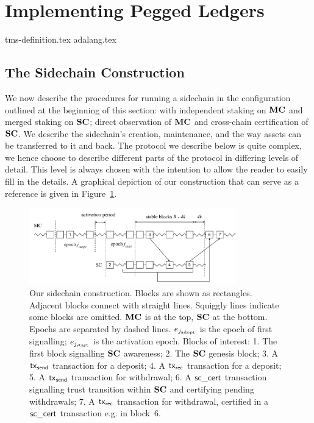 \section{Implementing Pegged Ledgers}
\label{sec:construction}




{tms-definition.tex}
{adalang.tex}

\subsection{The Sidechain Construction}
\label{sec:const}

We now describe the procedures for running a sidechain in the configuration
outlined at the beginning of this section: with independent staking on $\mathbf{MC}$ and
merged staking on $\mathbf{SC}$; direct observation of $\mathbf{MC}$ and
cross-chain certification of $\mathbf{SC}$.
We describe the sidechain's creation,
maintenance, and the way assets can be  transferred to it and back.  The
protocol we describe below is quite complex,
we hence choose to describe different parts of the protocol in
differing levels of detail. This level is always chosen with the intention to allow the
reader to easily fill in the details.
A graphical depiction of our construction that can serve as a reference
is given in Figure~\ref{fig:sidechain}.
\begin{figure}[tb]%
  \centering
  \includegraphics[width=0.8\textwidth]{chapters/sidechains/figures/sidechains-overview.pdf}
  \caption{
  Our sidechain construction. Blocks are shown as rectangles. Adjacent blocks
  connect with straight lines. Squiggly lines indicate some blocks are omitted.
  $\mathbf{MC}$ is at the top, $\mathbf{SC}$ at the bottom. Epochs are separated by dashed
  lines. $e_{j_\text{adopt}}$ is the epoch of first signalling;
  $e_{j_\text{start}}$ is the activation epoch. Blocks of interest: 1. The
  first block signalling $\mathbf{SC}$ awareness;
  2. The $\mathbf{SC}$ genesis block; 3. A $\mathsf{tx}_{\mathsf{send}}$
  transaction for a deposit; 4. A $\mathsf{tx}_{\mathsf{rec}}$ transaction for a
  deposit; 5. A $\mathsf{tx}_{\mathsf{send}}$ transaction for withdrawal; 6. A $\mathsf{sc\_cert}$
  transaction signalling trust transition within $\mathbf{SC}$ and certifying pending
  withdrawals; 7. A $\mathsf{tx}_{\mathsf{rec}}$ transaction for withdrawal, certified in a $\mathsf{sc\_cert}$
  transaction e.g. in block~6.
  }
  \label{fig:sidechain}
\end{figure}%

